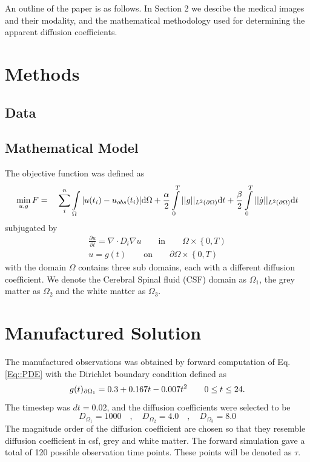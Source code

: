 \documentclass[11pt,a4paper]{article}
\begin{document}
An outline of the paper is as follows. In Section 2 we descibe the medical images and their modality,  
and the mathematical methodology used for determining the apparent diffusion coefficients.  


\section{Methods}


\subsection*{Data}

\subsection*{Mathematical Model}
The objective function was defined as 
\begin{equation}
\min_{u,g} F = \quad \sum\limits_i\sp{n} \int\limits_{\Omega} |u(t_i) - u_{obs}(t_i)| \mathrm{d}\Omega + \frac{\alpha}{2} \int\limits_{0}\sp{T} || g ||_{L\sp{2}(\partial\Omega)} \mathrm{d}t + \frac{\beta}{2} \int\limits_{0}\sp{T} || \dot{g} ||_{L\sp{2}(\partial\Omega)}\mathrm{d}t 
\end{equation}
subjugated by   
\begin{equation}
\begin{aligned}
\frac{\partial u}{\partial t} = \nabla \cdot  D_i \nabla u \qquad \text{in} \qquad \Omega \times \left\lbrace 0 , T \right)  \\
u=g(t) \qquad \text{on} \qquad \partial\Omega  \times \left\lbrace 0 , T \right) 
\end{aligned}
\label{Eq::PDE}
\end{equation}
with the domain $\Omega$ contains three sub domains, each with a different diffusion coefficient. We denote the Cerebral Spinal fluid (CSF) domain as $\Omega_1$, the grey matter as $\Omega_2$ and the white matter as $\Omega_3$.

\section*{Manufactured Solution}
The manufactured observations was obtained by forward computation of Eq.\ref{Eq::PDE} with the Dirichlet boundary condition defined as
\begin{equation}
g(t)_{\partial \Omega_1} = 0.3 +0.167t - 0.007t\sp{2} \qquad  0 \leq t \leq 24.
\end{equation}
The timestep was $dt = 0.02$, and the diffusion coefficients were selected to be 
\begin{equation}
D_{\Omega_1} = 1000 \quad , \quad D_{\Omega_2} = 4.0 \quad , \quad D_{\Omega_3} = 8.0 
\end{equation}  
The magnitude order of the diffusion coefficient are chosen so that they resemble diffusion coefficient in csf, grey and white matter. The forward simulation gave a total of 120 possible observation time points. These points 
will be denoted as $\tau$.
\end{document}
